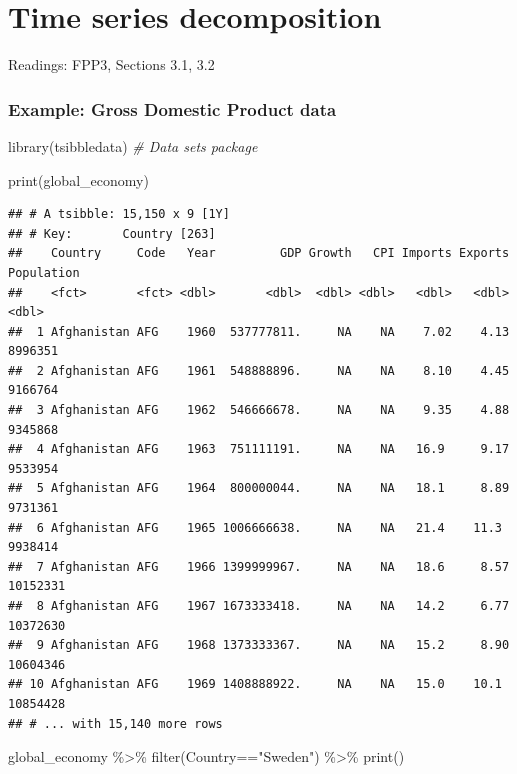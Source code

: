 \documentclass[
]{book}
\newenvironment{Shaded}{\begin{snugshade}}{\end{snugshade}}
\newcommand{\CommentTok}[1]{\textcolor[rgb]{0.56,0.35,0.01}{\textit{#1}}}
\newcommand{\FunctionTok}[1]{\textcolor[rgb]{0.00,0.00,0.00}{#1}}
\newcommand{\NormalTok}[1]{#1}
\newcommand{\SpecialCharTok}[1]{\textcolor[rgb]{0.00,0.00,0.00}{#1}}
\newcommand{\StringTok}[1]{\textcolor[rgb]{0.31,0.60,0.02}{#1}}
\begin{document}
\hypertarget{time-series-decomposition}{%
\chapter{Time series decomposition}\label{time-series-decomposition}}

Readings: FPP3, Sections 3.1, 3.2

\hypertarget{example-gross-domestic-product-data}{%
\subsection{Example: Gross Domestic Product data}\label{example-gross-domestic-product-data}}

\begin{Shaded}
\begin{Highlighting}[]
\FunctionTok{library}\NormalTok{(tsibbledata) }\CommentTok{\# Data sets package}

\FunctionTok{print}\NormalTok{(global\_economy)}
\end{Highlighting}
\end{Shaded}

\begin{verbatim}
## # A tsibble: 15,150 x 9 [1Y]
## # Key:       Country [263]
##    Country     Code   Year         GDP Growth   CPI Imports Exports Population
##    <fct>       <fct> <dbl>       <dbl>  <dbl> <dbl>   <dbl>   <dbl>      <dbl>
##  1 Afghanistan AFG    1960  537777811.     NA    NA    7.02    4.13    8996351
##  2 Afghanistan AFG    1961  548888896.     NA    NA    8.10    4.45    9166764
##  3 Afghanistan AFG    1962  546666678.     NA    NA    9.35    4.88    9345868
##  4 Afghanistan AFG    1963  751111191.     NA    NA   16.9     9.17    9533954
##  5 Afghanistan AFG    1964  800000044.     NA    NA   18.1     8.89    9731361
##  6 Afghanistan AFG    1965 1006666638.     NA    NA   21.4    11.3     9938414
##  7 Afghanistan AFG    1966 1399999967.     NA    NA   18.6     8.57   10152331
##  8 Afghanistan AFG    1967 1673333418.     NA    NA   14.2     6.77   10372630
##  9 Afghanistan AFG    1968 1373333367.     NA    NA   15.2     8.90   10604346
## 10 Afghanistan AFG    1969 1408888922.     NA    NA   15.0    10.1    10854428
## # ... with 15,140 more rows
\end{verbatim}

\begin{Shaded}
\begin{Highlighting}[]
\NormalTok{global\_economy }\SpecialCharTok{\%\textgreater{}\%} \FunctionTok{filter}\NormalTok{(Country}\SpecialCharTok{==}\StringTok{"Sweden"}\NormalTok{) }\SpecialCharTok{\%\textgreater{}\%} \FunctionTok{print}\NormalTok{()}
\end{Highlighting}
\end{Shaded}
\end{document}
